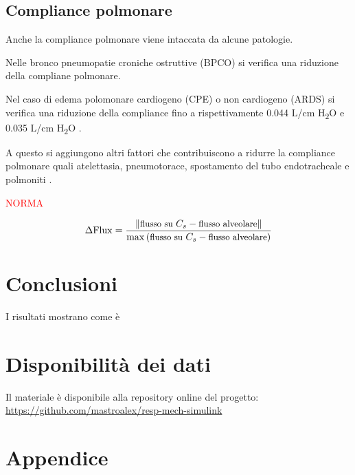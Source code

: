 \subsection{Compliance polmonare}

Anche la compliance polmonare viene intaccata da alcune patologie.

Nelle bronco pneumopatie croniche ostruttive (BPCO) si verifica una riduzione della compliane polmonare.

Nel caso di edema polomonare cardiogeno (CPE) o non cardiogeno (ARDS) si verifica una riduzione della compliance fino a rispettivamente 0.044 L/cm H\textsubscript{2}O e 0.035 L/cm H\textsubscript{2}O \cite{milic-emili_basics_1999}.

A questo si aggiungono altri fattori che contribuiscono a ridurre la compliance polmonare quali atelettasia, pneumotorace, spostamento del tubo endotracheale e polmoniti \cite{grossbach_overview_2011}.


\textcolor{red}{NORMA}

\begin{equation}
	\small{
\Delta \mathrm{Flux}={	\|\text{flusso su }C_s - \text{flusso alveolare}\|\over \max\left(\text{flusso su }C_s - \text{flusso alveolare}\right)}}
\label{eq:shunt_Delta}
\end{equation}

\section{Conclusioni}

I risultati mostrano come è 

\textcolor{blue}{
	\lipsum[1-2]
}
\section*{Disponibilità dei dati}

Il materiale è disponibile alla repository online del progetto: \url{https://github.com/mastroalex/resp-mech-simulink}


\raggedbottom

\pagebreak
\printbibliography[title=Riferimenti]


\clearpage
\onecolumn
\section*{Appendice}
